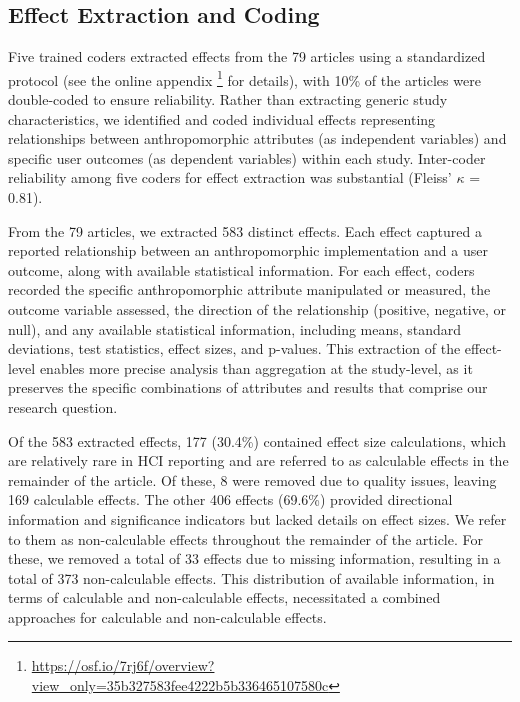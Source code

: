 \documentclass[manuscript,anonymous,sigconf]{acmart}
\begin{document}
\subsection{Effect Extraction and Coding}

Five trained coders extracted effects from the 79 articles using a standardized protocol (see the online appendix \footnote{\href{https://osf.io/7rj6f/overview?view_only=35b327583fee4222b5b336465107580c}{https://osf.io/7rj6f/overview?view\_only=35b327583fee4222b5b336465107580c}} for details), with 10\% of the articles were double-coded to ensure reliability. Rather than extracting generic study characteristics, we identified and coded individual effects representing relationships between anthropomorphic attributes (as independent variables) and specific user outcomes (as dependent variables) within each study. Inter-coder reliability among five coders for effect extraction was substantial (Fleiss' $\kappa$ = 0.81).

From the 79 articles, we extracted 583 distinct effects. Each effect captured a reported relationship between an anthropomorphic implementation and a user outcome, along with available statistical information. For each effect, coders recorded the specific anthropomorphic attribute manipulated or measured, the outcome variable assessed, the direction of the relationship (positive, negative, or null), and any available statistical information, including means, standard deviations, test statistics, effect sizes, and p-values. This extraction of the effect-level enables more precise analysis than aggregation at the study-level, as it preserves the specific combinations of attributes and results that comprise our research question.

Of the 583 extracted effects, 177 (30.4\%) contained effect size calculations, which are relatively rare in HCI reporting and are referred to as calculable effects in the remainder of the article. Of these, 8 were removed due to quality issues, leaving 169 calculable effects. The other 406 effects (69.6\%) provided directional information and significance indicators but lacked details on effect sizes. We refer to them as non-calculable effects throughout the remainder of the article. For these, we removed a total of 33 effects due to missing information, resulting in a total of 373 non-calculable effects. 
This distribution of available information, in terms of calculable and non-calculable effects, necessitated a combined approaches for calculable and non-calculable effects.
\end{document}
